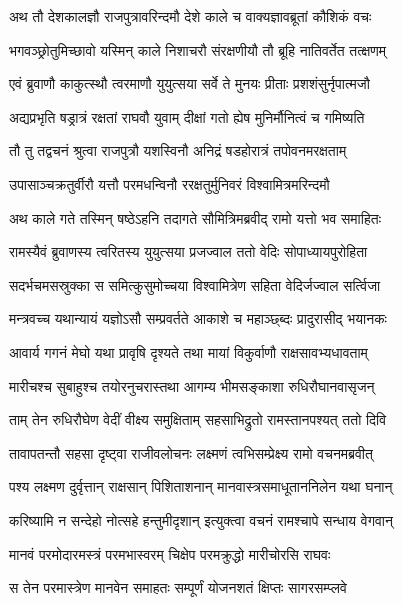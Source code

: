 
\twolineshloka
{अथ तौ देशकालज्ञौ राजपुत्रावरिन्दमौ}
{देशे काले च वाक्यज्ञावब्रूतां कौशिकं वचः} %

\twolineshloka
{भगवञ्छ्रोतुमिच्छावो यस्मिन् काले निशाचरौ}
{संरक्षणीयौ तौ ब्रूहि नातिवर्तेत तत्क्षणम्} %

\twolineshloka
{एवं ब्रुवाणौ काकुत्स्थौ त्वरमाणौ युयुत्सया}
{सर्वे ते मुनयः प्रीताः प्रशशंसुर्नृपात्मजौ} %

\twolineshloka
{अद्यप्रभृति षड्रात्रं रक्षतां राघवौ युवाम्}
{दीक्षां गतो ह्येष मुनिर्मौनित्वं च गमिष्यति} %

\twolineshloka
{तौ तु तद्वचनं श्रुत्वा राजपुत्रौ यशस्विनौ}
{अनिद्रं षडहोरात्रं तपोवनमरक्षताम्} %

\twolineshloka
{उपासाञ्चक्रतुर्वीरौ यत्तौ परमधन्विनौ}
{ररक्षतुर्मुनिवरं विश्वामित्रमरिन्दमौ} %

\twolineshloka
{अथ काले गते तस्मिन् षष्ठेऽहनि तदागते}
{सौमित्रिमब्रवीद् रामो यत्तो भव समाहितः} %

\twolineshloka
{रामस्यैवं ब्रुवाणस्य त्वरितस्य युयुत्सया}
{प्रजज्वाल ततो वेदिः सोपाध्यायपुरोहिता} %

\twolineshloka
{सदर्भचमसस्रुक्का स समित्कुसुमोच्चया}
{विश्वामित्रेण सहिता वेदिर्जज्वाल सर्त्विजा} %

\twolineshloka
{मन्त्रवच्च यथान्यायं यज्ञोऽसौ सम्प्रवर्तते}
{आकाशे च महाञ्छ्ब्दः प्रादुरासीद् भयानकः} %

\twolineshloka
{आवार्य गगनं मेघो यथा प्रावृषि दृश्यते}
{तथा मायां विकुर्वाणौ राक्षसावभ्यधावताम्} %

\twolineshloka
{मारीचश्च सुबाहुश्च तयोरनुचरास्तथा}
{आगम्य भीमसङ्काशा रुधिरौघानवासृजन्} %

\twolineshloka
{ताम् तेन रुधिरौघेण वेदीं वीक्ष्य समुक्षिताम्}
{सहसाभिद्रुतो रामस्तानपश्यत् ततो दिवि} %

\twolineshloka
{तावापतन्तौ सहसा दृष्ट्वा राजीवलोचनः}
{लक्ष्मणं त्वभिसम्प्रेक्ष्य रामो वचनमब्रवीत्} %

\twolineshloka
{पश्य लक्ष्मण दुर्वृत्तान् राक्षसान् पिशिताशनान्}
{मानवास्त्रसमाधूताननिलेन यथा घनान्} %

\twolineshloka
{करिष्यामि न सन्देहो नोत्सहे हन्तुमीदृशान्}
{इत्युक्त्वा वचनं रामश्चापे सन्धाय वेगवान्} %

\twolineshloka
{मानवं परमोदारमस्त्रं परमभास्वरम्}
{चिक्षेप परमक्रुद्धो मारीचोरसि राघवः} %

\twolineshloka
{स तेन परमास्त्रेण मानवेन समाहतः}
{सम्पूर्णं योजनशतं क्षिप्तः सागरसम्प्लवे} %

